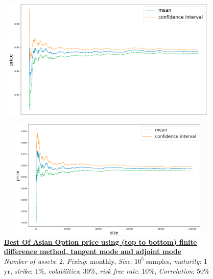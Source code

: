 \documentclass {article}
\begin{document}
			
			\begin{center}
				\begin{figure}[!h]
					\centering
				        \includegraphics[width=15cm, height=6cm]{bestOfAsianOptionTangentModePrice.png}
				\end{figure}
			\end{center}

			\begin{center}
				\begin{figure}[!h]
					\centering
						\includegraphics[width=15cm, height=6cm]{bestOfAsianOptionAdjointModePrice.png}
						\caption{\textbf{\underline{Best Of Asian Option price using (top to bottom) finite difference method, tangent mode and adjoint mode}} 
						\\ \textit{Number of assets}: 2, \textit{Fixing}: monthly, \textit{Size}: $10^{5}$ samples, \textit{maturity}: 1 yr, \textit{strike}: 1\%, \textit{volatilities}: 30\%, \textit{risk free rate}: 10\%, \textit{Correlation}: 50\%}
				\end{figure}
			\end{center}

			\newpage
\end{document}
